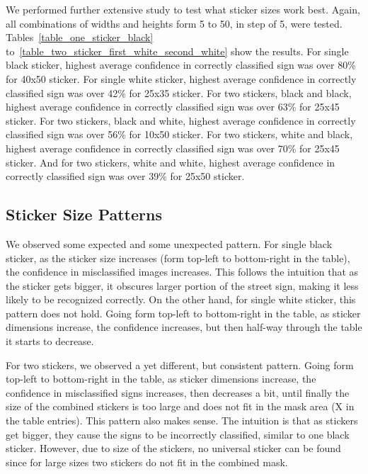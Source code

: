 We performed further extensive study to test what sticker sizes work best. Again, all combinations of widths and heights form 5 to 50, in step of 5, were tested. Tables~\ref{table_one_sticker_black} to~\ref{table_two_sticker_first_white_second_white} show the results.
For single black sticker, highest average confidence in correctly classified sign was over 80\% for 40x50 sticker.
For single white sticker, highest average confidence in correctly classified sign was over 42\% for 25x35 sticker.
For two stickers, black and black, highest average confidence in correctly classified sign was over 63\% for 25x45 sticker.
For two stickers, black and white, highest average confidence in correctly classified sign was over 56\% for 10x50 sticker.
For two stickers, white and black, highest average confidence in correctly classified sign was over 70\% for 25x45 sticker.
And for two stickers, white and white, highest average confidence in correctly classified sign was over 39\% for 25x50 sticker.

\subsection{Sticker Size Patterns}

We observed some expected and some unexpected pattern. For single black sticker, as the sticker size increases (form top-left to bottom-right in the table), the confidence in misclassified images increases. This follows the intuition that as the sticker gets bigger, it obscures larger portion of the street sign, making it less likely to be recognized correctly. On the other hand, for single white sticker, this pattern does not hold. Going form top-left to bottom-right in the table, as sticker dimensions increase, the confidence increases, but then half-way through the table it starts to decrease.

For two stickers, we observed a yet different, but consistent pattern. Going form top-left to bottom-right in the table, as sticker dimensions increase, the confidence in misclassified signs increases, then decreases a bit, until finally the size of the combined stickers is too large and does not fit in the mask area (X in the table entries). This pattern also makes sense. The intuition is that as stickers get bigger, they cause the signs to be incorrectly classified, similar to one black sticker. However, due to size of the stickers, no universal sticker can be found since for large sizes two stickers do not fit in the combined mask.

















